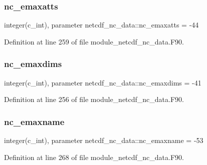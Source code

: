 \subsubsection{\texorpdfstring{nc\+\_\+emaxatts}{nc\_emaxatts}}
{\footnotesize\ttfamily integer(c\+\_\+int), parameter netcdf\+\_\+nc\+\_\+data\+::nc\+\_\+emaxatts = -\/44}



Definition at line 259 of file module\+\_\+netcdf\+\_\+nc\+\_\+data.\+F90.

\mbox{\label{namespacenetcdf__nc__data_a2fab3352811943122732cf9dabd6230a}} 
\subsubsection{\texorpdfstring{nc\+\_\+emaxdims}{nc\_emaxdims}}
{\footnotesize\ttfamily integer(c\+\_\+int), parameter netcdf\+\_\+nc\+\_\+data\+::nc\+\_\+emaxdims = -\/41}



Definition at line 256 of file module\+\_\+netcdf\+\_\+nc\+\_\+data.\+F90.

\mbox{\label{namespacenetcdf__nc__data_aed1b24db9fb95b548b1b2c88d05cc036}} 
\subsubsection{\texorpdfstring{nc\+\_\+emaxname}{nc\_emaxname}}
{\footnotesize\ttfamily integer(c\+\_\+int), parameter netcdf\+\_\+nc\+\_\+data\+::nc\+\_\+emaxname = -\/53}



Definition at line 268 of file module\+\_\+netcdf\+\_\+nc\+\_\+data.\+F90.

\mbox{\label{namespacenetcdf__nc__data_a21a339b9ce80e3705aedc309fcb6be3c}} 
